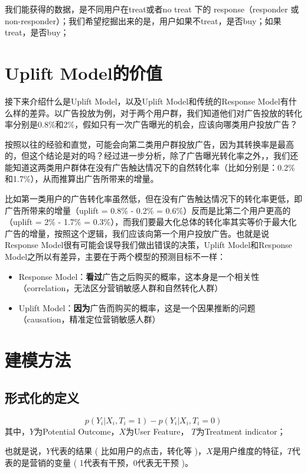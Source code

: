 \documentclass[12pt]{article}
\begin{document}
我们能获得的数据，是不同用户在treat或者no treat 下的 response（responder 或 non-responder）；我们希望挖掘出来的是，用户如果不treat，是否buy；如果 treat，是否buy；

\section{Uplift Model的价值}
接下来介绍什么是Uplift Model，以及Uplift Model和传统的Response Model有什么样的差异。以广告投放为例，对于两个用户群，我们知道他们对广告投放的转化率分别是0.8\%和2\%，假如只有一次广告曝光的机会，应该向哪类用户投放广告？

按照以往的经验和直觉，可能会向第二类用户群投放广告，因为其转换率是最高的，但这个结论是对的吗？经过进一步分析，除了广告曝光转化率之外，，我们还能知道这两类用户群体在没有广告触达情况下的自然转化率（比如分别是：0.2\%和1.7\%），从而推算出广告所带来的增量。

比如第一类用户的广告转化率虽然低，但在没有广告触达情况下的转化率更低，即广告所带来的增量（uplift = 0.8\% - 0.2\% = 0.6\%）反而是比第二个用户更高的（uplift = 2\% - 1.7\% = 0.3\%），而我们要最大化总体的转化率其实等价于最大化广告的增量，按照这个逻辑，我们应该向第一个用户投放广告。也就是说Response Model很有可能会误导我们做出错误的决策，Uplift Model和Response Model之所以有差异，主要在于两个模型的预测目标不一样：
    \begin{itemize}
\setlength{\itemsep}{0pt}
\setlength{\parsep}{0pt}
\setlength{\parskip}{0pt}
    \item Response Model：\textbf{看过}广告之后购买的概率，这本身是一个相关性（correlation，无法区分营销敏感人群和自然转化人群）
    \item Uplift Model：\textbf{因为}广告而购买的概率，这是一个因果推断的问题（causation，精准定位营销敏感人群）
\end{itemize}

\section{建模方法}
\subsection{形式化的定义}
$$
p(Y_i|X_i, T_i = 1) - p(Y_i|X_i, T_i = 0) 
$$
其中，$Y$为Potential Outcome，$X$为User Feature， $T$为Treatment indicator；

也就是说，$Y$代表的结果 ( 比如用户的点击，转化等 )，$X$是用户维度的特征，$T$代表的是营销的变量 ( 1代表有干预，0代表无干预 )。
\end{document}
